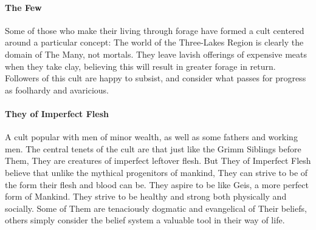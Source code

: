 \paragraph{The Few}
Some of those who make their living through forage have formed a cult centered around a particular concept: The world of the Three-Lakes Region is clearly the domain of The Many, not mortals. They leave lavish offerings of expensive meats when they take clay, believing this will result in greater forage in return. Followers of this cult are happy to subsist, and consider what passes for progress as foolhardy and avaricious.

\paragraph{They of Imperfect Flesh}
A cult popular with men of minor wealth, as well as some fathers and working men. The central tenets of the cult are that just like the Grimm Siblings before Them, They are creatures of imperfect leftover flesh. But They of Imperfect Flesh believe that unlike the mythical progenitors of mankind, They can strive to be of the form their flesh and blood can be. They aspire to be like Geis, a more perfect form of Mankind. They strive to be healthy and strong both physically and socially. Some of Them are tenaciously dogmatic and evangelical of Their beliefs, others simply consider the belief system a valuable tool in their way of life.